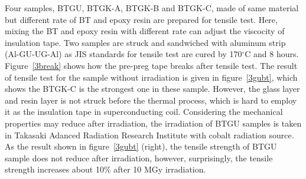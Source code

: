 Four samples, BTGU, BTGK-A, BTGK-B and BTGK-C, made of same material but different rate of BT and epoxy resin are prepared for tensile test.
Here, mixing the BT and epoxy resin with different rate can adjust the viscocity of insulation tape.
Two samples are struck and sandwiched with aluminum strip (Al-GU-UG-Al) as JIS standards for tensile test are cured by 170$^{\circ}$C and 8 hours.
Figure~\ref{3break} shows how the pre-preg tape breaks after tensile test.
The result of tensile test for the sample without irradiation is given in figure~\ref{3gubt}, which shows the BTGK-C is the strongest one in these sample.
However, the glass layer and resin layer is not struck before the thermal process, which is hard to employ it as the insulation tape in superconducting coil.
Considering the mechanical properties may reduce after irradiation, the irradiation of BTGU samples is taken in Takasaki Adanced Radiation Research Institute with cobalt radiation source.
As the result shown in figure~\ref{3gubt} (right), the tensile strength of BTGU sample does not reduce after irradiation, however, surprisingly, the tensile strength increases about 10\% after 10 MGy irradiation.
